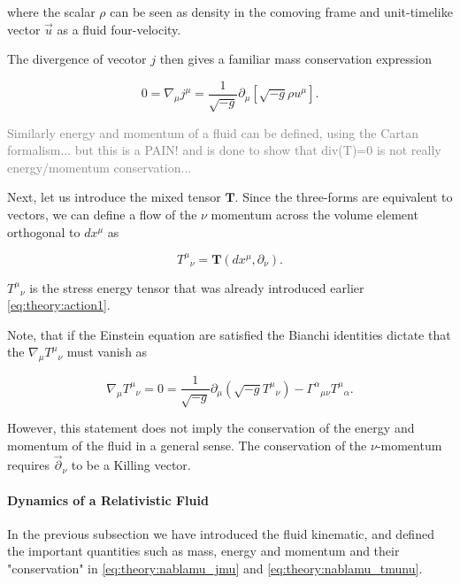where the scalar $\rho$ can be seen as density in the comoving frame and unit-timelike vector $\vec{u}$ as a fluid four-velocity.

The divergence of vecotor $j$ then gives a familiar mass conservation expression

\begin{equation}
0 = \nabla_{\mu} j^{\mu} = \frac{1}{\sqrt{-g}}\partial_{\mu}[\sqrt{-g}\rho u^{\mu}].
\label{eq:theory:nablamu_jmu}
\end{equation}

\textcolor{gray}{
    Similarly energy and momentum of a fluid can be defined, using the Cartan formalism... but this is a PAIN! and is done to show that div(T)=0 is not really energy/momentum conservation...
}

Next, let us introduce the mixed tensor $\boldsymbol{T}$. 
Since the three-forms are equivalent to vectors, we can define a flow of the $\nu$ momentum across the volume element orthogonal to $dx^{\mu}$ as 

\begin{equation}
{T^{\mu}}_{\nu}=\boldsymbol{T}(dx^{\mu},\partial_{\nu}).
\end{equation}

${T^{\mu}}_{\nu}$ is the stress energy tensor that was already introduced earlier \ref{eq:theory:action1}. 

Note, that if the Einstein equation are satisfied the Bianchi identities dictate that the $\nabla_{\mu}{T^{\mu}}_{\nu}$ must vanish as

\begin{equation}
\nabla_{\mu}{T^{\mu}}_{\nu} = 0= \frac{1}{\sqrt{-g}}\partial_{\mu}(\sqrt{-g}{T^{\mu}}_{\nu}) - {\Gamma^{\alpha}}_{\mu\nu}{T^{\mu}}_{\alpha}.
\label{eq:theory:nablamu_tmunu}
\end{equation}

However, this statement does not imply the conservation of the energy and momentum of the fluid in a general sense. 
The conservation of the $\nu$-momentum requires $\vec{\partial}_{\nu}$ to be a Killing vector.


\paragraph{Dynamics of a Relativistic Fluid}


In the previous subsection we have introduced the fluid kinematic, and defined the important quantities such as mass, energy and momentum and their "conservation" in \ref{eq:theory:nablamu_jmu} and \ref{eq:theory:nablamu_tmunu}.

